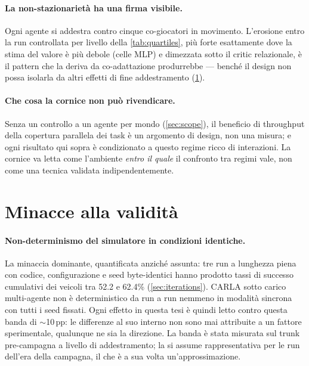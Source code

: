 \paragraph{La non-stazionarietà ha una firma visibile.}
Ogni agente si addestra contro cinque co-giocatori in movimento.
L'erosione entro la run controllata per livello della
\cref{tab:quartiles}, più forte esattamente dove la stima del valore è
più debole (celle MLP) e dimezzata sotto il critic relazionale, è il
pattern che la deriva da co-adattazione produrrebbe --- benché il
design non possa isolarla da altri effetti di fine addestramento
(\cref{sec:threats}).

\paragraph{Che cosa la cornice non può rivendicare.}
Senza un controllo a un agente per mondo (\cref{sec:scope}), il
beneficio di throughput della copertura parallela dei task è un
argomento di design, non una misura; e ogni risultato qui sopra è
condizionato a questo regime ricco di interazioni. La cornice va letta
come l'ambiente \emph{entro il quale} il confronto tra regimi vale, non
come una tecnica validata indipendentemente.

\section{Minacce alla validità}
\label{sec:threats}

\paragraph{Non-determinismo del simulatore in condizioni identiche.}
La minaccia dominante, quantificata anziché assunta: tre run a
lunghezza piena con codice, configurazione e seed byte-identici hanno
prodotto tassi di successo cumulativi dei veicoli tra 52.2 e 62.4\%
(\cref{sec:iterations}). CARLA sotto carico multi-agente non è
deterministico da run a run nemmeno in modalità sincrona con tutti i
seed fissati. Ogni effetto in questa tesi è quindi letto contro questa
banda di $\sim$10\,pp: le differenze al suo interno non sono mai
attribuite a un fattore sperimentale, qualunque ne sia la direzione. La
banda è stata misurata sul trunk pre-campagna a livello di
addestramento; la si assume rappresentativa per le run dell'era della
campagna, il che è a sua volta un'approssimazione.

